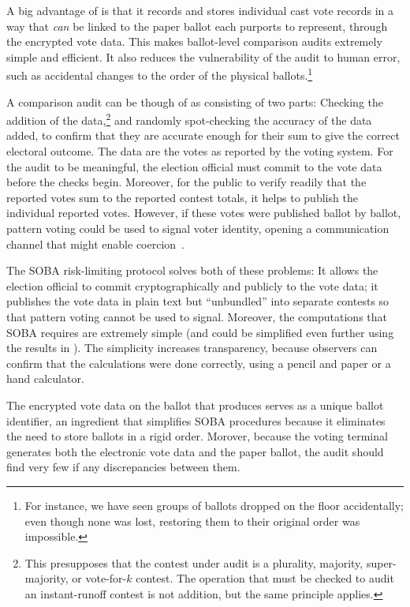 A big advantage of \projname is that it records and stores individual cast vote records in a way that 
{\em can\/} be linked to
the paper ballot each purports to represent, through the encrypted vote data.
This makes ballot-level comparison audits extremely simple and efficient.
It also reduces the vulnerability of the audit to human error, such as accidental changes to the order
of the physical ballots.\footnote{%
   For instance, we have seen groups of ballots dropped on the floor accidentally;
   even though none was lost, restoring them to their original order was impossible.
}

A comparison audit can be though of as consisting of two parts:
Checking the addition of the data,\footnote{%
   This presupposes that the contest under audit is a plurality, majority, super-majority, or vote-for-$k$
   contest.
   The operation that must be checked to audit an instant-runoff contest is not addition, but the
   same principle applies.
}
and randomly spot-checking the accuracy of the data added, to confirm that they are accurate
enough for their sum to give the correct electoral outcome.
The data are the votes as reported by the voting system.
For the audit to be meaningful, the election official must commit to the vote data before the
checks begin.
Moreover, for the public to verify readily that the reported votes sum to the reported contest totals,
it helps to publish the individual reported votes.
However, if these votes were published ballot by ballot, pattern voting could be used to signal voter identity,
opening a communication channel that might enable coercion~\cite{rescorla09,benalohEtal11}.

The SOBA risk-limiting protocol \citep{benalohEtal11} solves both of these problems:
It allows the election official to commit cryptographically and publicly to the vote data; it publishes
the vote data in plain text but ``unbundled'' into separate contests so that pattern voting cannot
be used to signal.
Moreover, the computations that SOBA requires are extremely simple (and could be simplified
even further using the results in \citet{lindemanStark12}).
The simplicity increases transparency, because observers can confirm that the calculations
were done correctly, using a pencil and paper or a hand calculator.

The encrypted vote data on the ballot that \projname produces serves as a unique ballot identifier,
an ingredient that simplifies SOBA procedures because it eliminates the need to store ballots in a rigid order.
Morover, because the voting terminal generates both the electronic vote data and the paper ballot, the audit should find very few if any discrepancies between them.

